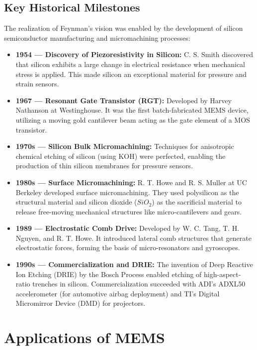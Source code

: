 \documentclass[12pt,a4paper]{article}
\begin{document}
\subsection{Key Historical Milestones}
The realization of Feynman's vision was enabled by the development of silicon semiconductor manufacturing and micromachining processes:
\begin{itemize}[leftmargin=*, itemsep=4pt]
  \item \textbf{1954 --- Discovery of Piezoresistivity in Silicon:} C. S. Smith discovered that silicon exhibits a large change in electrical resistance when mechanical stress is applied. This made silicon an exceptional material for pressure and strain sensors.
  \item \textbf{1967 --- Resonant Gate Transistor (RGT):} Developed by Harvey Nathanson at Westinghouse. It was the first batch-fabricated MEMS device, utilizing a moving gold cantilever beam acting as the gate element of a MOS transistor.
  \item \textbf{1970s --- Silicon Bulk Micromachining:} Techniques for anisotropic chemical etching of silicon (using KOH) were perfected, enabling the production of thin silicon membranes for pressure sensors.
  \item \textbf{1980s --- Surface Micromachining:} R. T. Howe and R. S. Muller at UC Berkeley developed surface micromachining. They used polysilicon as the structural material and silicon dioxide ($SiO_2$) as the sacrificial material to release free-moving mechanical structures like micro-cantilevers and gears.
  \item \textbf{1989 --- Electrostatic Comb Drive:} Developed by W. C. Tang, T. H. Nguyen, and R. T. Howe. It introduced lateral comb structures that generate electrostatic forces, forming the basis of micro-resonators and gyroscopes.
  \item \textbf{1990s --- Commercialization and DRIE:} The invention of Deep Reactive Ion Etching (DRIE) by the Bosch Process enabled etching of high-aspect-ratio trenches in silicon. Commercialization succeeded with ADI's ADXL50 accelerometer (for automotive airbag deployment) and TI's Digital Micromirror Device (DMD) for projectors.
\end{itemize}

\section{Applications of MEMS}
\end{document}
